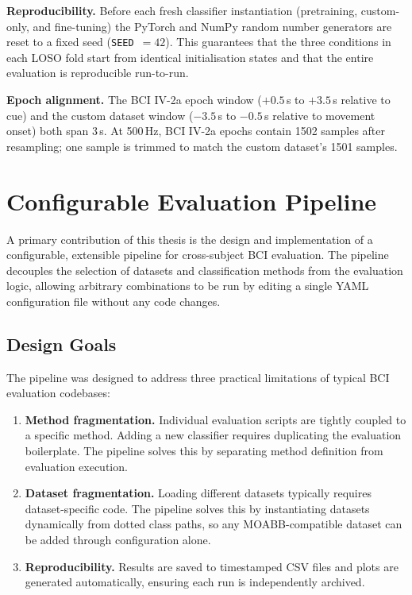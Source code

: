 \documentclass[english, bc, kiv, he, iso690alph, pdf]{fasthesis}
\begin{document}
\textbf{Reproducibility.} Before each fresh classifier instantiation (pretraining, custom-only, and fine-tuning) the PyTorch and NumPy random number generators are reset to a fixed seed (\texttt{SEED}~$=42$). This guarantees that the three conditions in each LOSO fold start from identical initialisation states and that the entire evaluation is reproducible run-to-run.

\textbf{Epoch alignment.} The BCI IV-2a epoch window ($+0.5$\,s to $+3.5$\,s relative to cue) and the custom dataset window ($-3.5$\,s to $-0.5$\,s relative to movement onset) both span 3\,s. At 500\,Hz, BCI IV-2a epochs contain 1502 samples after resampling; one sample is trimmed to match the custom dataset's 1501 samples.

\section{Configurable Evaluation Pipeline}

A primary contribution of this thesis is the design and implementation of a configurable, extensible pipeline for cross-subject BCI evaluation. The pipeline decouples the selection of datasets and classification methods from the evaluation logic, allowing arbitrary combinations to be run by editing a single YAML configuration file without any code changes.

\subsection{Design Goals}

The pipeline was designed to address three practical limitations of typical BCI evaluation codebases:

\begin{enumerate}
    \item \textbf{Method fragmentation.} Individual evaluation scripts are tightly coupled to a specific method. Adding a new classifier requires duplicating the evaluation boilerplate. The pipeline solves this by separating method definition from evaluation execution.
    \item \textbf{Dataset fragmentation.} Loading different datasets typically requires dataset-specific code. The pipeline solves this by instantiating datasets dynamically from dotted class paths, so any MOABB-compatible dataset can be added through configuration alone.
    \item \textbf{Reproducibility.} Results are saved to timestamped CSV files and plots are generated automatically, ensuring each run is independently archived.
\end{enumerate}
\end{document}
